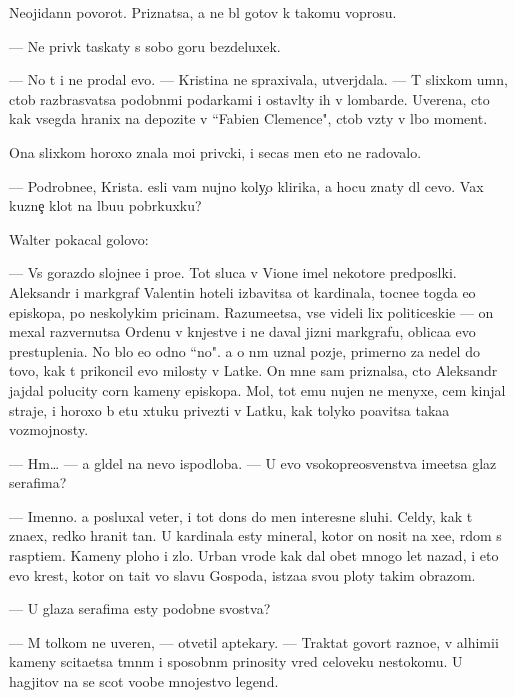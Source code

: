 \documentclass[10pt]{book}
\begin{document}
Neojidann{\yi}{\y} povorot. Priznatsa, {\y}a ne b{\yi}l gotov k takomu voprosu.

— Ne priv{\yi}k taskaty s sobo{\y} goru bezdeluxek.

— No t{\yi} i ne prodal {\y}evo. — Kristina ne spraxivala, utverjdala. — T{\yi} slixkom um{\e}n, ctob{\yi} razbras{\yi}vatsa podobn{\yi}mi podarkami i ostavl{\ia}ty ih v lombarde. Uverena, cto kak vsegda hranix na depozite v ``Fabien Clemence", ctob{\yi} vz{\ia}ty v l{\iu}bo{\y} moment.

Ona slixkom horoxo znala mo{\y}i priv{\yi}cki, i se{\y}cas men{\ia} eto ne radovalo.

— Podrobne{\y}e, Krista. {\Y}esli vam nujno koly{\c}o klirika, {\y}a hocu znaty dl{\ia} cevo. Vax kuzne{\c} kl{\iu}{\y}ot na l{\iu}bu{\y}u pobr{\ia}kuxku?

Walter pokacal golovo{\y}:

— Vs{\e} gorazdo slojne{\y}e i pro{\x}e. Tot sluca{\y} v Vione imel nekotor{\yi}{\y}e predpos{\yi}lki. Aleksandr i markgraf Valentin hoteli izbavitsa ot kardinala, tocne{\y}e togda {\y}e{\x}o {\y}episkopa, po neskolykim pricinam. Razume{\y}etsa, vse videli lix politiceski{\y}e — on mexal razvernutsa Ordenu v kn{\ia}jestve i ne daval jizni markgrafu, oblica{\y}a {\y}evo prestupleni{\y}a. No b{\yi}lo {\y}e{\x}o odno ``no". {\Y}a o n{\e}m uznal pozje, primerno za nedel{\iu} do tovo, kak t{\yi} prikoncil {\y}evo milosty v Latke. On mne sam priznalsa, cto Aleksandr jajdal polucity corn{\yi}{\y} kameny {\y}episkopa. Mol, tot {\y}emu nujen ne menyxe, cem kinjal{\yi} straje{\y}, i horoxo b{\yi} etu xtuku privezti v Latku, kak tolyko po{\y}avitsa taka{\y}a vozmojnosty.

— Hm… — {\Y}a gl{\ia}del na nevo ispodlob{\y}a. — U {\y}evo v{\yi}sokopreosv{\ia}{\x}enstva ime{\y}etsa glaz serafima?

— Imenno. {\Y}a posluxal veter, i tot don{\e}s do men{\ia} interesn{\yi}{\y}e sluhi. Cel{\ia}dy, kak t{\yi} zna{\y}ex, redko hranit ta{\y}n{\yi}. U kardinala {\y}esty mineral, kotor{\yi}{\y} on nosit na xe{\y}e, r{\ia}dom s rasp{\ia}ti{\y}em. Kameny ploho{\y} i zlo{\y}. Urban vrode kak dal obet mnogo let nazad, i eto {\y}evo krest, kotor{\yi}{\y} on ta{\x}it vo slavu Gospoda, ist{\ia}za{\y}a svo{\y}u ploty takim obrazom.

— U glaza serafima {\y}esty podobn{\yi}{\y}e svo{\y}stva?

— M{\yi} tolkom ne uveren{\yi}, — otvetil aptekary. — Traktat{\yi} govor{\ia}t razno{\y}e, v alhimi{\y}i kameny scita{\y}etsa t{\e}mn{\yi}m i sposobn{\yi}m prinosity vred celoveku nesto{\y}komu. U hagjitov na se{\y} scot voob{\x}e mnojestvo legend.
\end{document}
